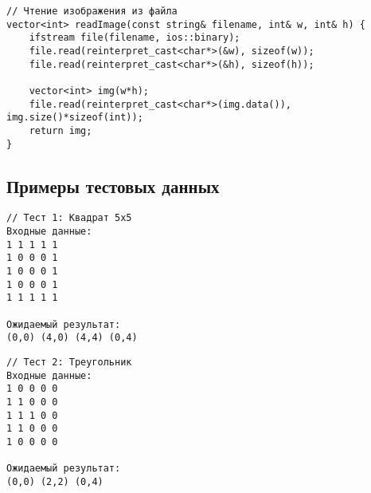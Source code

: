 \documentclass[12pt]{article}
\begin{document}
\begin{appendices}
\begin{verbatim}
// Чтение изображения из файла
vector<int> readImage(const string& filename, int& w, int& h) {
    ifstream file(filename, ios::binary);
    file.read(reinterpret_cast<char*>(&w), sizeof(w));
    file.read(reinterpret_cast<char*>(&h), sizeof(h));
    
    vector<int> img(w*h);
    file.read(reinterpret_cast<char*>(img.data()), img.size()*sizeof(int));
    return img;
}
\end{verbatim}

\subsection{Примеры тестовых данных}

\begin{verbatim}
// Тест 1: Квадрат 5x5
Входные данные:
1 1 1 1 1
1 0 0 0 1 
1 0 0 0 1
1 0 0 0 1
1 1 1 1 1

Ожидаемый результат:
(0,0) (4,0) (4,4) (0,4)
\end{verbatim}

\begin{verbatim}
// Тест 2: Треугольник
Входные данные:
1 0 0 0 0
1 1 0 0 0 
1 1 1 0 0
1 1 0 0 0
1 0 0 0 0

Ожидаемый результат:
(0,0) (2,2) (0,4)
\end{verbatim}
\end{appendices}
\end{document}
